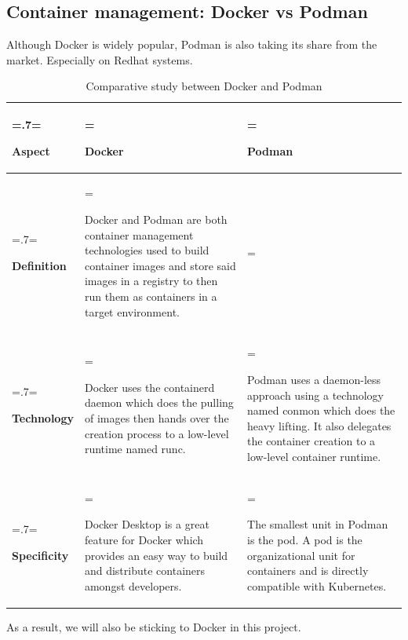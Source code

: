 \subsection{Container management: Docker vs Podman}
Although Docker is widely popular, Podman is also taking its share from the market. Especially on Redhat systems.
\begin{table}[H]
    \renewcommand{\arraystretch}{1.5}%
    \caption{Comparative study between Docker and Podman}
    \centering
    \medskip
    \begin{tabularx}{1\textwidth} {
            | >{\hsize=.7\hsize\linewidth=\hsize\raggedright\arraybackslash}X
            | >{\hsize=1.15\hsize\linewidth=\hsize\raggedright\arraybackslash}X
            | >{\hsize=1.15\hsize\linewidth=\hsize\raggedright\arraybackslash}X |}
        \hline
        \rowcolor{primary} \textbf {Aspect} & \textbf {Docker}                                                                                                                                                                                                                    & \textbf {Podman}                                                                                                                                                            \\
        \hline
        \textbf {Definition}                & \multicolumn{2}{|>{\hsize=2.35\hsize}X|} {Docker and Podman are both  container management technologies used to build container images and store said images in a registry to then run them as containers in a target environment.}                                                                                                                                                                               \\
        \hline
        \textbf {Technology}                & Docker uses the containerd daemon which does the pulling of images then hands over the creation process to a low-level runtime named runc.                                                                                          & Podman uses a daemon-less approach using a technology named conmon which does the heavy lifting. It also delegates the container creation to a low-level container runtime. \\
        \hline
        \textbf {Specificity}               & Docker Desktop is a great feature for Docker which provides an easy way to build and distribute containers amongst developers.                                                                                                      & The smallest unit in Podman is the pod. A pod is the organizational unit for containers and is directly compatible with Kubernetes.                                         \\
        \hline
    \end{tabularx}
\end{table}
As a result, we will also be sticking to Docker in this project.

